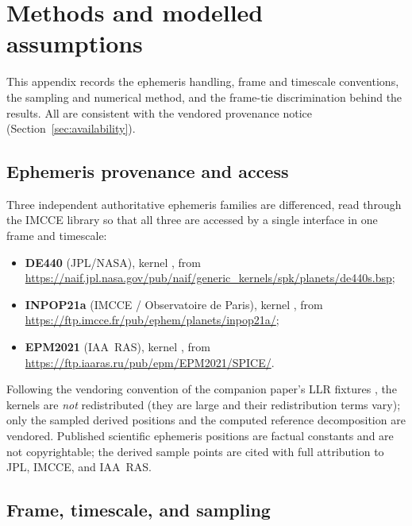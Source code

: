 \section{Methods and modelled assumptions}
\label{app:methods}

This appendix records the ephemeris handling, frame and timescale conventions, the
sampling and numerical method, and the frame-tie discrimination behind the results.
All are consistent with the vendored provenance notice
(Section~\ref{sec:availability}).

\subsection{Ephemeris provenance and access}
\label{app:provenance}

Three independent authoritative ephemeris families are differenced, read through the
IMCCE  library so that all three are accessed by a single interface in
one frame and timescale:
\begin{itemize}
  \item \textbf{DE440} (JPL/NASA), kernel 
  \citep{park2021de440}, from
  \url{https://naif.jpl.nasa.gov/pub/naif/generic_kernels/spk/planets/de440s.bsp};
  \item \textbf{INPOP21a} (IMCCE / Observatoire de Paris), kernel
  \allowbreak{}\allowbreak{}
  \citep{fienga2021inpop21a}, from
  \url{https://ftp.imcce.fr/pub/ephem/planets/inpop21a/};
  \item \textbf{EPM2021} (IAA~RAS), kernel 
  \citep{pitjeva2021epm2021}, from \url{https://ftp.iaaras.ru/pub/epm/EPM2021/SPICE/}.
\end{itemize}
Following the vendoring convention of the companion paper's LLR fixtures
\citep{baweja2026datum}, the kernels are \emph{not} redistributed (they are large and
their redistribution terms vary); only the sampled derived positions and the computed
reference decomposition are vendored. Published scientific ephemeris positions are
factual constants and are not copyrightable; the derived sample points are cited with
full attribution to JPL, IMCCE, and IAA~RAS.

\subsection{Frame, timescale, and sampling}
\label{app:sampling}

